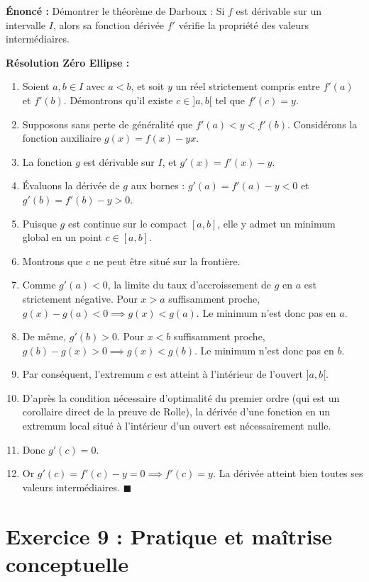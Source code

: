 \documentclass[11pt,a4paper]{article}
\begin{document}
\textbf{Énoncé :}
Démontrer le théorème de Darboux : Si $f$ est dérivable sur un intervalle $I$, alors sa fonction dérivée $f'$ vérifie la propriété des valeurs intermédiaires.

\textbf{Résolution Zéro Ellipse :}
\begin{enumerate}
\item Soient $a, b \in I$ avec $a < b$, et soit $y$ un réel strictement compris entre $f'(a)$ et $f'(b)$. Démontrons qu'il existe $c \in ]a,b[$ tel que $f'(c) = y$.
\item Supposons sans perte de généralité que $f'(a) < y < f'(b)$. Considérons la fonction auxiliaire $g(x) = f(x) - y x$.
\item La fonction $g$ est dérivable sur $I$, et $g'(x) = f'(x) - y$.
\item Évaluons la dérivée de $g$ aux bornes : $g'(a) = f'(a) - y < 0$ et $g'(b) = f'(b) - y > 0$.
\item Puisque $g$ est continue sur le compact $[a,b]$, elle y admet un minimum global en un point $c \in [a,b]$.
\item Montrons que $c$ ne peut être situé sur la frontière.
\item Comme $g'(a) < 0$, la limite du taux d'accroissement de $g$ en $a$ est strictement négative. Pour $x > a$ suffisamment proche, $g(x) - g(a) < 0 \implies g(x) < g(a)$. Le minimum n'est donc pas en $a$.
\item De même, $g'(b) > 0$. Pour $x < b$ suffisamment proche, $g(b) - g(x) > 0 \implies g(x) < g(b)$. Le minimum n'est donc pas en $b$.
\item Par conséquent, l'extremum $c$ est atteint à l'intérieur de l'ouvert $]a,b[$.
\item D'après la condition nécessaire d'optimalité du premier ordre (qui est un corollaire direct de la preuve de Rolle), la dérivée d'une fonction en un extremum local situé à l'intérieur d'un ouvert est nécessairement nulle.
\item Donc $g'(c) = 0$.
\item Or $g'(c) = f'(c) - y = 0 \implies f'(c) = y$. La dérivée atteint bien toutes ses valeurs intermédiaires. $\blacksquare$
\end{enumerate}


\vspace{1em}

\section*{Exercice 9 : Pratique et maîtrise conceptuelle}
\end{document}
